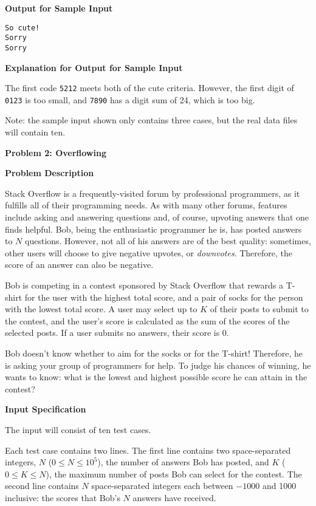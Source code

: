 \documentclass[11pt]{article}
\newcommand{\problem}[2]{\textbf{\Large Problem #1: #2} \vspace{0.4em}}
\newcommand{\heading}[1]{\vspace{0.6em} \textbf{#1}}
\begin{document}
\vspace{-\topsep}
\heading{Output for Sample Input}
\vspace{-\topsep}
\begin{verbatim}
So cute!
Sorry
Sorry
\end{verbatim}

\vspace{-\topsep}
\heading{Explanation for Output for Sample Input}

The first code \verb|5212| meets both of the cute criteria. However, the first digit of \verb|0123| is too small, and \verb|7890| has a digit sum of 24, which is too big.

Note: the sample input shown only contains three cases, but the real data files will contain ten.


\pagebreak




\problem{2}{Overflowing}


\heading{Problem Description}

Stack Overflow is a frequently-visited forum by professional programmers, as it fulfills all of their programming needs. As with many other forums, features include asking and answering questions and, of course, upvoting answers that one finds helpful. Bob, being the enthusiastic programmer he is, has posted answers to $N$ questions. However, not all of his answers are of the best quality: sometimes, other users will choose to give negative upvotes, or \textit{downvotes}. Therefore, the score of an answer can also be negative.

Bob is competing in a contest sponsored by Stack Overflow that rewards a T-shirt for the user with the highest total score, and a pair of socks for the person with the lowest total score. A user may select up to $K$ of their posts to submit to the contest, and the user’s score is calculated as the sum of the scores of the selected posts. If a user submits no answers, their score is 0.

Bob doesn't know whether to aim for the socks or for the T-shirt! Therefore, he is asking your group of programmers for help. To judge his chances of winning, he wants to know: what is the lowest and highest possible score he can attain in the contest?

\heading{Input Specification}

The input will consist of ten test cases.

Each test case contains two lines. The first line contains two space-separated integers, $N$ ($0 \le N \le 10^5$), the number of answers Bob has posted, and $K$ ($0 \le K \le N$), the maximum number of posts Bob can select for the contest. The second line contains $N$ space-separated integers each between $-1000$ and 1000 inclusive: the scores that Bob's $N$ answers have received.
\end{document}
